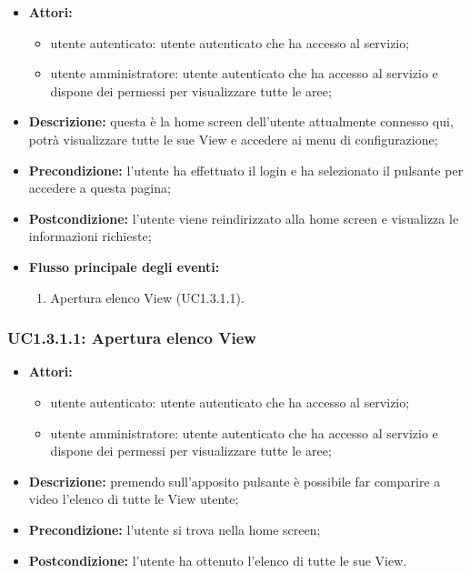\begin{itemize}
    \item \textbf{Attori:}
    \begin{itemize}
    	\item utente autenticato: utente autenticato che ha accesso al servizio;
    	\item utente amministratore: utente autenticato che ha accesso al servizio e dispone dei permessi per visualizzare tutte le aree;
	\end{itemize}
    \item \textbf{Descrizione:} questa è la home screen dell'utente attualmente connesso qui, potrà visualizzare tutte le sue View e accedere ai menu di configurazione;
    \item \textbf{Precondizione:} l'utente ha effettuato il login e ha selezionato il pulsante per accedere a questa pagina;
    \item \textbf{Postcondizione:} l'utente viene reindirizzato alla home screen e visualizza le informazioni richieste;
	\item \textbf{Flusso principale degli eventi:}
		\begin{enumerate}
			\item Apertura elenco View (UC1.3.1.1).
		\end{enumerate}
\end{itemize}
\subsubsection{UC1.3.1.1: Apertura elenco View}

\begin{itemize}
    \item \textbf{Attori:}
    \begin{itemize}
    	\item utente autenticato: utente autenticato che ha accesso al servizio;
    	\item utente amministratore: utente autenticato che ha accesso al servizio e dispone dei permessi per visualizzare tutte le aree;
	\end{itemize}
    \item \textbf{Descrizione:} premendo sull'apposito pulsante è possibile far comparire a video l'elenco di tutte le View utente;
    \item \textbf{Precondizione:} l'utente si trova nella home screen;
    \item \textbf{Postcondizione:} l'utente ha ottenuto l'elenco di tutte le sue View.
\end{itemize}

